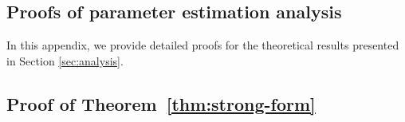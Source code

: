 \documentclass[final]{siamltex}
\begin{document}
\begin{appendices}
\clearpage
\section{Proofs of parameter estimation analysis}\label{app:proofs}
In this appendix, we provide detailed proofs for the theoretical results 
presented in Section \ref{sec:analysis}. 
\subsection{Proof of Theorem~\ref{thm:strong-form}}\label{app:proof_thm41} 


\end{appendices}
\end{document}
